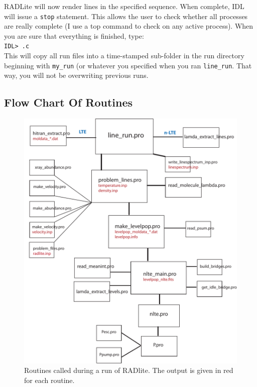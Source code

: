 \documentclass[11pt]{article}
\begin{document}
\begin{itemize}
RADLite will now render lines in the specified sequence. When complete, IDL will issue a {\tt stop} statement. This allows the user to check
whether all processes are really complete (I use a top command to check on any active process). When you are sure that everything
is finished, type:\\
{\tt IDL> .c }\\

This will copy all run files into a time-stamped sub-folder in the run directory beginning with {\tt my\_run} (or whatever you specified when
you ran {\tt line\_run}. That way, you will not be overwriting previous runs. 

\end{itemize}

\subsection{Flow Chart Of Routines}

\begin{figure}
\centering
\includegraphics[scale=0.4]{RADLite_flowchart_2012.pdf}
\caption{Routines called during a run of RADlite.  The output is given in red for each routine.}
\end{figure}
\end{document}
